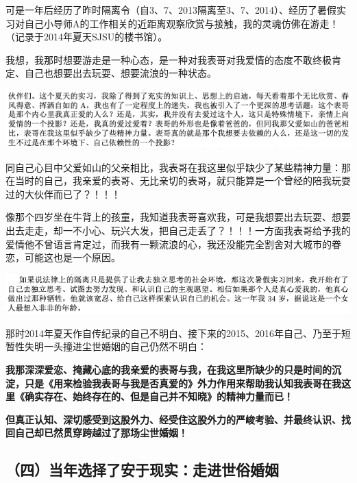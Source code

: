 \documentclass[9pt, b5paper]{article}
\begin{document}
可是一年后经历了昨时隔离令（自3、7、2013隔离至3、7、2014）、经历了暑假实习对自己小导师A的工作相关的近距离观察欣赏与接触，我的灵魂仿佛在游走！（记录于2014年夏天SJSU的楼书馆）。

我想，我那时想要游走是一种心态，是一种对我表哥对我爱情的态度不敢终极肯定、自己也想要出去玩耍、想要流浪的一种状态。

\begin{center}
\includegraphics[width=.9\linewidth]{./pic/backups_plans_20210422_075555.png}
\end{center}

同自己心目中父爱如山的父亲相比，我表哥在我这里似乎缺少了某些精神力量：那在当时的自己，我亲爱的表哥、无比亲切的表哥，就只能算是一个曾经的陪我玩耍过的大伙伴而已了？！！！

像那个四岁坐在牛背上的孩童，我知道我表哥喜欢我，可是我想要出去玩耍、想要出去走走，却一不小心、玩兴大发，把自己走丢了？！！！一方面我表哥给予我的爱情他不曾语言肯定过，而我有一颗流浪的心，我还没能完全割舍对大城市的眷恋，可能这也是一个原因。

\begin{center}
\includegraphics[width=.9\linewidth]{./pic/backups_plans_20210422_075830.png}
\end{center}

那时2014年夏天作自传纪录的自己不明白、接下来的2015、2016年自己、乃至于短暂性失明一头撞进尘世婚姻的自己仍然不明白：

\textbf{我那深深爱恋、掩藏心底的我亲爱的表哥与我，在我这里所缺少的只是时间的沉淀，只是《用来检验我表哥与我是否真爱的》外力作用来帮助我认知我表哥在我这里《确实存在、始终存在的、但是自己并不知晓》的精神力量而已！}

\textbf{但真正认知、深切感受到这股外力、经受住这股外力的严峻考验、并最终认识、找回自己却已然贯穿跨越过了那场尘世婚姻！}

\subsection{（四）当年选择了安于现实：走进世俗婚姻}
\label{sec:orgdbd4673}
\end{document}
